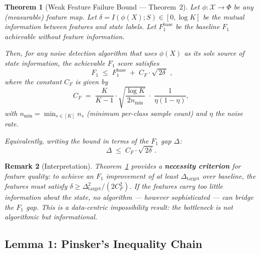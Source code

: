 \documentclass[12pt,a4paper]{article}
\newtheorem{theorem}{Theorem}[section]
\newtheorem{remark}[theorem]{Remark}
\newcommand{\cX}{\mathcal{X}}
\newcommand{\gap}{\Delta}
\begin{document}
\begin{theorem}[Weak Feature Failure Bound --- Theorem~2]
\label{thm:weak-feature}
Let $\phi: \cX \to \Phi$ be any (measurable) feature map.
Let $\delta = I(\phi(X); S) \in [0, \log K]$ be the mutual information
between features and state labels.  Let $F_1^{\mathrm{base}}$ be the baseline
$F_1$ achievable without feature information.

Then, for any noise detection algorithm that uses $\phi(X)$ as its sole
source of state information, the achievable $F_1$ score satisfies
\begin{equation}\label{eq:main-bound}
    \boxed{\;
    F_1 \;\leq\; F_1^{\mathrm{base}} \;+\; C_F \cdot \sqrt{\,2\delta\,}
    \;},
\end{equation}
where the constant $C_F$ is given by
\begin{equation}\label{eq:cf-def}
    C_F \;=\; \frac{K}{K-1} \cdot \sqrt{\frac{\log K}{2n_{\min}}}
            \;\cdot\; \frac{1}{\eta(1-\eta)},
\end{equation}
with $n_{\min} = \min_{s\in[K]} n_s$ (minimum per-class sample count)
and $\eta$ the noise rate.

Equivalently, writing the bound in terms of the $F_1$ gap $\gap$:
\begin{equation}\label{eq:gap-bound}
    \gap \;\leq\; C_F \cdot \sqrt{\,2\delta\,}.
\end{equation}
\end{theorem}

\begin{remark}[Interpretation]
\label{rem:interpretation}
Theorem~\ref{thm:weak-feature} provides a \textbf{necessity criterion} for
feature quality: to achieve an $F_1$ improvement of at least $\gap_{\text{target}}$
over baseline, the features must satisfy
$\delta \geq \gap_{\text{target}}^2 / (2C_F^2)$.
If the features carry too little information about the state, no algorithm
--- however sophisticated --- can bridge the $F_1$ gap.  This is a
\textit{data-centric} impossibility result: the bottleneck is not algorithmic
but informational.
\end{remark}

\subsection{Lemma 1: Pinsker's Inequality Chain}
\label{sec:lemma1}
\end{document}
